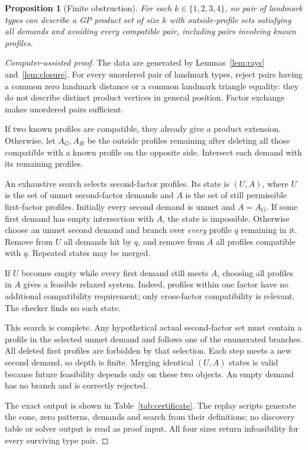 \documentclass[11pt]{article}
\newtheorem{proposition}[theorem]{Proposition}
\theoremstyle{definition}
\theoremstyle{remark}
\begin{document}
\begin{proposition}[Finite obstruction]\label{prop:finite}
For each $k\in\{1,2,3,4\}$, no pair of landmark types can describe a GP
product set of size $k$ with outside-profile sets satisfying all demands
and avoiding every compatible pair, including pairs involving known
profiles.
\end{proposition}
\begin{proof}[Computer-assisted proof]
The data are generated by Lemmas~\ref{lem:rays} and~\ref{lem:closure}.
For every unordered pair of landmark types, reject pairs having a common
zero landmark distance or a common landmark triangle equality: they do
not describe distinct product vertices in general position. Factor
exchange makes unordered pairs sufficient.

If two known profiles are compatible, they already give a product
extension. Otherwise, let $A_G,A_H$ be the outside profiles remaining
after deleting all those compatible with a known profile on the opposite
side. Intersect each demand with its remaining profiles.

An exhaustive search selects second-factor profiles. Its state is
$(U,A)$, where $U$ is the set of unmet second-factor demands and $A$ is
the set of still permissible first-factor profiles. Initially every
second demand is unmet and $A=A_G$. If some first demand has empty
intersection with $A$, the state is impossible. Otherwise choose an
unmet second demand and branch over \emph{every} profile $q$ remaining
in it. Remove from $U$ all demands hit by $q$, and remove from $A$ all
profiles compatible with $q$. Repeated states may be merged.

If $U$ becomes empty while every first demand still meets $A$, choosing
all profiles in $A$ gives a feasible relaxed system. Indeed, profiles
within one factor have no additional compatibility requirement; only
cross-factor compatibility is relevant. The checker finds no such state.

This search is complete. Any hypothetical actual second-factor set
must contain a profile in the selected unmet demand and follows one of
the enumerated branches. All deleted first profiles are forbidden by
that selection. Each step meets a new second demand, so depth is finite.
Merging identical $(U,A)$ states is valid because future feasibility
depends only on these two objects. An empty demand has no branch and
is correctly rejected.

The exact output is shown in Table~\ref{tab:certificate}. The replay
scripts generate the cone, zero patterns, demands and search from their
definitions; no discovery table or solver output is read as proof input.
All four sizes return infeasibility for every surviving type pair.
\end{proof}
\end{document}

